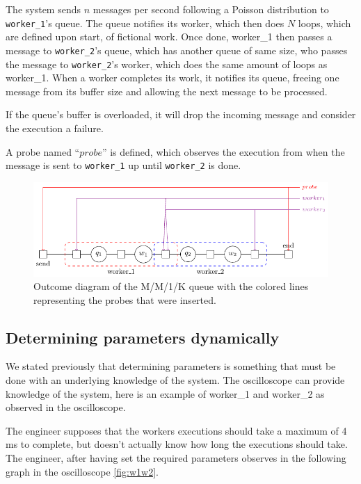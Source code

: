     The system sends $n$ messages per second following a Poisson distribution to \texttt{worker\_1}'s queue. 
    The queue notifies its worker, which then does $N$ loops, which are defined upon start, of fictional work. Once done, worker\_1 then passes a message to \texttt{worker\_2}'s queue, which has another queue of same size, who passes the message to \texttt{worker\_2}'s worker, which does the same amount of loops as worker\_1. When a worker completes its work, it notifies its queue, freeing one message from its buffer size and allowing the next message to be processed.
    
    If the queue's buffer is overloaded, it will drop the incoming message and consider the execution a failure.
    
    A probe named ``$probe$'' is defined, which observes the execution from when the message is sent to \texttt{worker\_1} up until \texttt{worker\_2} is done.
    \begin{figure}[H]
        \begin{center}
            \includegraphics[scale=1.2, width=\textwidth]{tikz/mm1k.pdf} 
        \end{center}
        \caption{Outcome diagram of the M/M/1/K queue with the colored lines representing the probes that were inserted.}
        \label{fig:mm1k}
    \end{figure}

    \subsection{Determining parameters dynamically}
        We stated previously that determining parameters is something that must be done with an underlying knowledge of the system. The oscilloscope can provide knowledge of the system, here is an example of worker\_1 and worker\_2 as observed in the oscilloscope.

        The engineer supposes that the workers executions should take a maximum of 4 ms to complete, but doesn't actually know how long the executions should take. The engineer, after having set the required parameters observes in the following graph in the oscilloscope \cref{fig:w1w2}.

